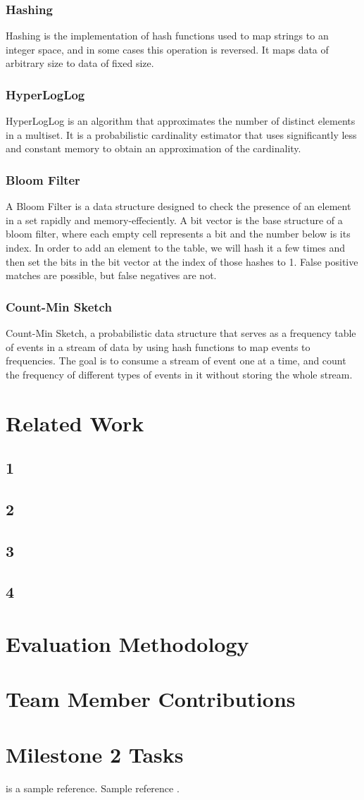 \documentclass[preprint,nocopyrightspace]{sig-alternate}
\begin{document}
\subsubsection{Hashing}
Hashing is the implementation of hash functions used to map strings to an integer space, and in some cases this operation is reversed. It maps data of arbitrary size to data of fixed size.
\subsubsection{HyperLogLog}	
HyperLogLog is an algorithm that approximates the number of distinct elements in a multiset. It is a probabilistic cardinality estimator that uses significantly less and constant memory to obtain an approximation of the cardinality.
\subsubsection{Bloom Filter}
A Bloom Filter is a data structure designed to check the presence of an element in a set rapidly and memory-effeciently. A bit vector is the base structure of a bloom filter, where each empty cell represents a bit and the number below is its index. In order to add an element to the table, we will hash it a few times and then set the bits in the bit vector at the index of those hashes to 1. False positive matches are possible, but false negatives are not.
\subsubsection{Count-Min Sketch}
Count-Min Sketch, a probabilistic data structure that serves as a frequency table of events in a stream of data by using hash functions to map events to frequencies. The goal is to consume a stream of event one at a time, and count the frequency of different types of events in it without storing the whole stream.
\section{Related Work}
\subsection{1}
\subsection{2}
\subsection{3}
\subsection{4}
\section{Evaluation Methodology}
\section{Team Member Contributions}
\section{Milestone 2 Tasks}

\citet{DBLP:conf/sc/Rubio-GonzalezNNDKSBIH13} is a sample reference.
Sample reference \cite{DBLP:conf/sc/Rubio-GonzalezNNDKSBIH13}.


\end{document}
